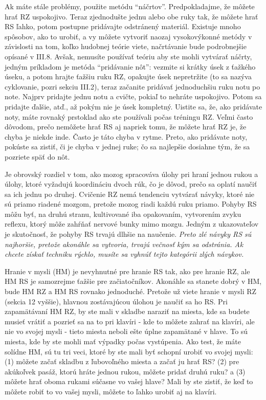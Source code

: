 Ak máte stále problémy, použite metódu “náčrtov”. Predpokladajme, že môžete hrať RZ uspokojivo. Teraz zjednodušte jednu alebo obe ruky tak, že môžete hrať RS ľahko, potom postupne pridávajte odstránený materiál. Existuje mnoho spôsobov, ako to urobiť, a vy môžete vytvoriť naozaj vysokovýkonné metódy v závislosti na tom, koľko hudobnej teórie viete, načrtávanie bude podrobnejšie opísané v III.8. Avšak, nemusíte používať teóriu aby ste mohli vytvárať náčrty, jedným príkladom je metóda “pridávanie nôt”: vezmite si krátky úsek z ťažkého úseku, a potom hrajte ťažšiu ruku RZ, opakujte úsek nepretržite (to sa nazýva cyklovanie, pozri sekciu III.2), teraz začanite pridávať jednoduchšiu ruku notu po note. Najprv pridajte jednu notu a cvičte, pokiaľ to nehráte uspokojivo. Potom sa pridajte ďalšie, atď., až pokým nie je úsek kompletný. Uistite sa, že, ako pridávate noty, máte rovnaký prstoklad ako ste používali počas tréningu RZ. Veľmi často dôvodom, prečo nemôžete hrať RS aj napriek tomu, že môžete hrať RZ je, že chyba je niekde inde. Často je táto chyba v rytme. Preto, ako pridávate noty, pokúste sa zistiť, či je chyba v jednej ruke; čo sa najlepšie dosiahne tým, že sa pozriete späť do nôt.

Je obrovský rozdiel v tom, ako mozog spracováva úlohy pri hraní jednou rukou a úlohy, ktoré vyžadujú koordináciu dvoch rúk, čo je dôvod, prečo sa oplatí naučiť sa ich jednu po druhej. Cvičenie RZ nemá tendenciu vytvárať návyky, ktoré nie sú priamo riadené mozgom, pretože mozog riadi každú ruku priamo. Pohyby RS môžu byť, na druhú stranu, kultivované iba opakovaním, vytvorením zvyku reflexu, ktorý môže zahŕňať nervové bunky mimo mozgu. Jedným z ukazovateľov je skutočnosť, že pohyby RS trvajú dlhšie na naučenie. \emph{Preto zlé návyky RS sú najhoršie, pretože akonáhle sa vytvoria, trvajú večnosť kým sa odstránia. Ak chcete získať techniku rýchlo, musíte sa vyhnúť tejto kategórii zlých návykov.}

Hranie v mysli (HM) je nevyhnutné pre hranie RS tak, ako pre hranie RZ, ale HM RS je samozrejme ťažšie pre začiatočníkov. Akonáhle sa stanete dobrý v HM, bude HM RZ a HM RS rovnako jednoduché. Pretože už viete hranie v mysli RZ (sekcia 12 vyššie), hlavnou zostávajúcou úlohou je naučiť sa ho RS. Pri zapamätávaní HM RZ, by ste mali v skladbe naraziť na miesta, kde sa budete musieť vrátiť a pozrieť sa na to pri klavíri - kde to môžete zahrať na klavíri, ale nie vo svojej mysli - tieto miesta neboli ešte úplne zapamätané v hlave. To sú miesta, kde by ste mohli mať výpadky počas vystúpenia. Ako test, že máte solídne HM, sú tu tri veci, ktoré by ste mali byť schopní urobiť vo svojej mysli: (1) môžete začať skladbu z ľubovoľného miesta a začať ju hrať RS? (2) pre akúkoľvek pasáž, ktorú hráte jednou rukou, môžete pridať druhú ruku? a (3) môžete hrať oboma rukami súčasne vo vašej hlave? Mali by ste zistiť, že keď to môžete robiť to vo vašej mysli, môžete to ľahko urobiť aj na klavíri.

